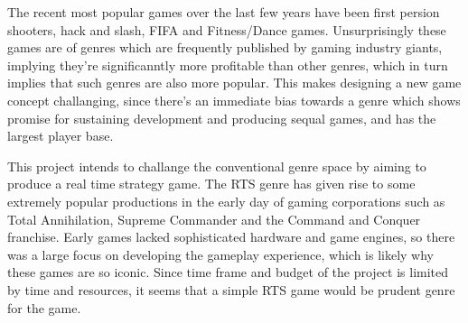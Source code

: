 The recent most popular games over the last few years have been first persion shooters, hack and slash, FIFA and  Fitness/Dance games. Unsurprisingly these games are of genres which are frequently published by gaming industry giants, implying they're significanntly more profitable than other genres, which in turn implies that such genres are also more popular. This makes designing a new game concept challanging, since there's an immediate bias towards a genre which shows promise for sustaining development and producing sequal games, and has the largest player base. 

This project intends to challange the conventional genre space by aiming to produce a real time strategy game. The RTS genre has given rise to some extremely popular productions in the early day of gaming corporations such as Total Annihilation, Supreme Commander and the Command and Conquer franchise. Early games lacked sophisticated hardware and game engines, so there was a large focus on developing the gameplay experience, which is likely why these games are so iconic. Since time frame and budget of the project is limited by time and resources, it seems that a simple RTS game would be prudent genre for the game.
